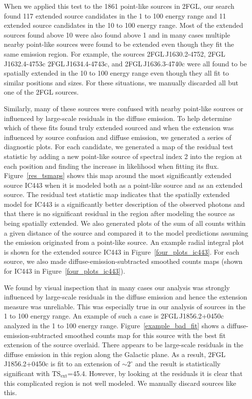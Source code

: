 \documentclass[12pt,preprint]{aastex}
\newcommand{\gev}{\text{GeV}\xspace}
\newcommand{\tsext}{{\ensuremath{\text{TS}_{\text{ext}}}}\xspace}
\newcommand{\degree}{^\circ\xspace}
\begin{document}
When we applied this test to the 1861 point-like sources in 2FGL, our
search found 117 extended source candidates in the 1 \gev to 100 \gev
energy range and 11 extended source candidates in the 10 \gev to 100
\gev energy range. Most of the extended sources found above 10 \gev were
also found above 1 \gev and in many cases multiple nearby point-like
sources were found to be extended even though they fit the same emission region.
For example, the sources 2FGL\,J1630.2-4752, 2FGL\,J1632.4-4753c 2FGL\,J1634.4-4743c,
and 2FGL\,J1636.3-4740c were all found to be spatially extended in the
10 \gev to 100 \gev energy range even though they all fit to similar
positions and sizes.  For these situations, we manually discarded all
but one of the 2FGL sources.

Similarly, many of these sources were confused with nearby
point-like sources or influenced by large-scale residuals in the
diffuse emission.  To help determine which of these fits found
truly extended sourced and when the extension was
influenced by source confusion and diffuse emission, we generated a
series of diagnostic plots.  For each candidate, we generated a map
of the residual test statistic by adding a new point-like source of spectral index 2 into the
region at each position and finding the increase in likelihood when fitting
its flux. Figure~\ref{res_tsmaps} shows this map around the
most significantly extended source IC443 when it is modeled both as a
point-like source and as an extended source.  The residual test statistic
map indicates
that the spatially extended model for IC443 is a significantly better
description of the observed photons and that there is no significant
residual in the region after modeling the source as being spatially extended.
We also generated plots of the sum of all counts within a given distance of
the source and compared it to the model predictions assuming the emission
originated from a point-like source.  An example radial integral plot
is shown for the extended source IC443 in Figure~\ref{four_plots_ic443}.
For each source, we also made diffuse-emission-subtracted smoothed counts
maps (shown for IC443 in Figure~\ref{four_plots_ic443}).

We found by visual inspection that in many
cases our analysis was strongly influenced by large-scale residuals in the
diffuse emission and hence the extension measure was unreliable.  This was
especially true in our analysis of sources in the 1 \gev to 100 \gev
energy range.  An example of such a case is 2FGL\,J1856.2+0450c analyzed
in the 1 \gev to 100 \gev energy range. Figure~\ref{example_bad_fit}
shows a diffuse-emission-subtracted smoothed counts map for
this source with the best
fit extension of the source overlaid. There appears to be large-scale
residuals in the diffuse emission in this region along the Galactic plane.
As a result, 2FGL\,J1856.2+0450c is fit to an extension of $\sim2\degree$
and the result is statistically significant with \tsext=45.4. However,
by looking at the residuals it is clear that this complicated region is
not well modeled. We manually discard sources like this.
\end{document}
